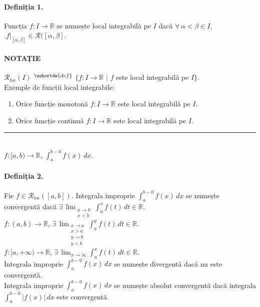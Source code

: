 \paragraph{Definiția 1.}
Funcția $f: I \rightarrow \mathbb{R}$ se numește local integrabilă pe $I$ dacă $\forall \, \alpha < \beta \in I$, $\bigl. f \bigr|_{[\alpha, \beta]} \in \mathcal{R}([\alpha, \beta]$. 

\paragraph{NOTAȚIE}
$\mathcal{R}_{loc}(I)$ $^{\ushortdw{def}}$ $\{ f: I \rightarrow \mathbb{R}$ $|$ $f$ este local integrabilă pe $I \}$. \\[10pt]
Exemple de funcții local integrabile:
\begin{enumerate}[label=\emph{\arabic*})]
    \item Orice funcție monotonă $f: I \rightarrow \mathbb{R}$ este local integrabilă pe $I$.
    \item Orice funcție continuă $f: I \rightarrow \mathbb{R}$ este local integrabilă pe $I$.
\end{enumerate}
\rule{450pt}{1pt}\\[5pt]
$f:[a,b) \rightarrow \mathbb{R}$, $\displaystyle\int_{a}^{b-0} f(x) \, dx$.

\paragraph{Definiția 2.}
Fie $f \in \mathcal{R}_{loc}([a,b])$. Integrala improprie $\displaystyle\int_{a}^{b-0} f(x) \, dx$ se numește convergentă dacă
$\exists \, \displaystyle\lim_{\substack{x \rightarrow b \\ x < b}} \displaystyle\int_{a}^{x} f(t) \, dt \in \mathbb{R}$. \\[8pt]
$f:(a, b) \rightarrow \mathbb{R}$,
$\exists \, \displaystyle\lim_{\substack{x \rightarrow a \\ x > a \\ y \rightarrow b \\ y < b}} \displaystyle\int_{x}^{y} f(t) \, dt \in \mathbb{R}$. \\[8pt]
$f:[a, +\infty) \rightarrow \mathbb{R}$,
$\exists \, \displaystyle\lim_{x \rightarrow \infty} \displaystyle\int_{a}^{x} f(t) \, dt \in \mathbb{R}$. \\[8pt]
Integrala improprie $\displaystyle\int_{a}^{b-0}f(x) \, dx$ se numește divergentă dacă nu este convergentă. \\
Integrala improprie $\displaystyle\int_{a}^{b-0}f(x) \, dx$ se numește absolut convergentă dacă integrala $\displaystyle\int_{a}^{b-0} \left| f(x) \right| \, dx$ este convergentă. \\

